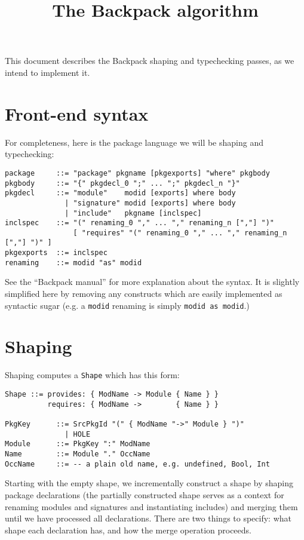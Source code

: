 \documentclass{article}
\title{The Backpack algorithm}
\begin{document}
\maketitle

This document describes the Backpack shaping and typechecking
passes, as we intend to implement it.

\section{Front-end syntax}

For completeness, here is the package language we will be shaping and typechecking:

\begin{verbatim}
package     ::= "package" pkgname [pkgexports] "where" pkgbody
pkgbody     ::= "{" pkgdecl_0 ";" ... ";" pkgdecl_n "}"
pkgdecl     ::= "module"    modid [exports] where body
              | "signature" modid [exports] where body
              | "include"   pkgname [inclspec]
inclspec    ::= "(" renaming_0 "," ... "," renaming_n [","] ")"
                [ "requires" "(" renaming_0 "," ... "," renaming_n [","] ")" ]
pkgexports  ::= inclspec
renaming    ::= modid "as" modid
\end{verbatim}

See the ``Backpack manual'' for more explanation about the syntax.  It
is slightly simplified here by removing any constructs which are easily implemented as
syntactic sugar (e.g. a \verb|modid| renaming is simply \verb|modid as modid|.)

\section{Shaping}

Shaping computes a \verb|Shape| which has this form:

\begin{verbatim}
Shape ::= provides: { ModName -> Module { Name } }
          requires: { ModName ->        { Name } }

PkgKey      ::= SrcPkgId "(" { ModName "->" Module } ")"
              | HOLE
Module      ::= PkgKey ":" ModName
Name        ::= Module "." OccName
OccName     ::= -- a plain old name, e.g. undefined, Bool, Int
\end{verbatim}

Starting with the empty shape, we incrementally construct a shape by
shaping package declarations (the partially constructed shape serves as
a context for renaming modules and signatures and instantiating
includes) and merging them until we have processed all declarations.
There are two things to specify: what shape each declaration has, and
how the merge operation proceeds.
\end{document}
